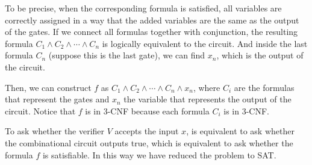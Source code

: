 \documentclass[a4paper,12pt]{article}
\begin{document}
To be precise, when the corresponding formula is satisfied, all variables are correctly assigned in a way that the added variables are the same as the output of the gates.
If we connect all formulas together with conjunction, the resulting formula $C_1 \wedge C_2 \wedge \cdots \wedge C_n$ is logically equivalent to the circuit.
And inside the last formula $C_n$ (suppose this is the last gate), we can find $x_n$, which is the output of the circuit.

Then, we can construct $f$ as $C_1 \wedge C_2 \wedge \cdots \wedge C_n \wedge x_n$, where $C_i$ are the formulas that represent the gates and $x_n$ the variable that represents the output of the circuit.
Notice that $f$ is in 3-CNF because each formula $C_i$ is in 3-CNF.

To ask whether the verifier $V$ accepts the input $x$, is equivalent to ask whether the combinational circuit outputs true, which is equivalent to ask whether the formula $f$ is satisfiable.
In this way we have reduced the problem to SAT.
\end{document}
